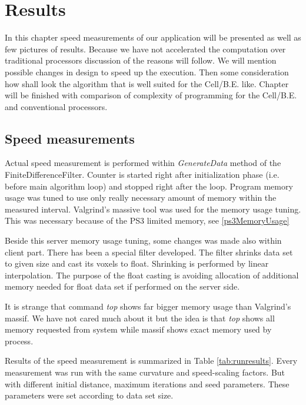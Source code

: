 \chapter{Results}

In this chapter speed measurements of our application will be presented as well as few pictures of results.
Because we have not accelerated the computation over traditional processors discussion of the reasons will follow.
We will mention possible changes in design to speed up the execution.
Then some consideration how shall look the algorithm that is well suited for the Cell/B.E. like.
Chapter will be finished with comparison of complexity of programming for the Cell/B.E. and conventional processors.

\section{Speed measurements}

\par
Actual speed measurement is performed within \emph{GenerateData} method of the FiniteDifferenceFilter.
Counter is started right after initialization phase (i.e. before main algorithm loop) and stopped right after the loop.
Program memory usage was tuned to use only really necessary amount of memory within the measured interval.
Valgrind's massive tool was used for the memory usage tuning.
This was necessary because of the PS3 limited memory, see \ref{ps3MemoryUsage}

\par
Beside this server memory usage tuning, some changes was made also within client part.
There has been a special filter developed.
The filter shrinks data set to given size and cast its voxels to float.
Shrinking is performed by linear interpolation.
The purpose of the float casting is avoiding allocation of additional memory needed for float data set if performed on the server side.

\par
It is strange that command \emph{top} shows far bigger memory usage than Valgrind's massif.
We have not cared much about it but the idea is that \emph{top} shows all memory requested from system while massif shows exact memory used by process.

\par
Results of the speed measurement is summarized in Table \ref{tab:runresults}.
Every measurement was run with the same curvature and speed-scaling factors.
But with different initial distance, maximum iterations and seed parameters.
These parameters were set according to data set size.

